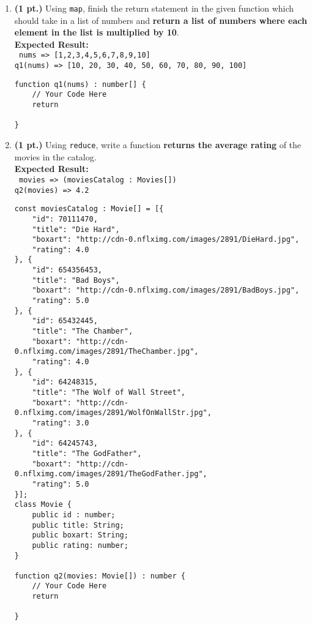 \documentclass[12pt]{article}
\begin{document}
  \begin{enumerate}

    \item \textbf{(1 pt.)} Using \texttt{map}, finish the return statement in the given function which should take in a list of numbers and \textbf{return a list of numbers where each element in the list is multiplied by 10}. \\
    \textbf{Expected Result:} \\
    \texttt{
    nums  => [1,2,3,4,5,6,7,8,9,10] \\
    q1(nums) => [10, 20, 30, 40, 50, 60, 70, 80, 90, 100]
    }
    
\begin{lstlisting}[style=JavaScript]
function q1(nums) : number[] {
    // Your Code Here
    return 

}
\end{lstlisting}



\newpage
    \item \textbf{(1 pt.)} Using \texttt{reduce}, write a function \textbf{returns the average rating} of the movies in the catalog. \\
    \textbf{Expected Result:} \\
    \texttt{
    movies  => (moviesCatalog : Movies[]) \\
    q2(movies) => 4.2
    }
\begin{lstlisting}[style=JavaScript]
const moviesCatalog : Movie[] = [{
    "id": 70111470,
    "title": "Die Hard",
    "boxart": "http://cdn-0.nflximg.com/images/2891/DieHard.jpg",
    "rating": 4.0
}, {
    "id": 654356453,
    "title": "Bad Boys",
    "boxart": "http://cdn-0.nflximg.com/images/2891/BadBoys.jpg",
    "rating": 5.0
}, {
    "id": 65432445,
    "title": "The Chamber",
    "boxart": "http://cdn-0.nflximg.com/images/2891/TheChamber.jpg",
    "rating": 4.0
}, {
    "id": 64248315,
    "title": "The Wolf of Wall Street",
    "boxart": "http://cdn-0.nflximg.com/images/2891/WolfOnWallStr.jpg",
    "rating": 3.0
}, {
    "id": 64245743,
    "title": "The GodFather",
    "boxart": "http://cdn-0.nflximg.com/images/2891/TheGodFather.jpg",
    "rating": 5.0
}];
class Movie {
    public id : number;
    public title: String; 
    public boxart: String;
    public rating: number;
}

function q2(movies: Movie[]) : number {
    // Your Code Here
    return 
    
}
\end{lstlisting}



\end{enumerate}
\end{document}
